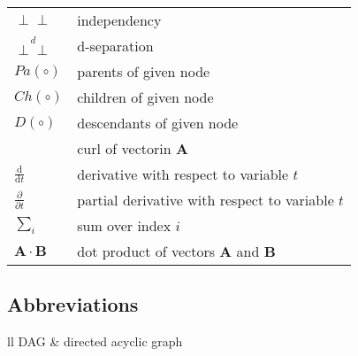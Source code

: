 \documentclass[main=english,12pt,a4paper,pdftex,econ,utf8]{aaltothesis}
\newcommand{\indep}{\perp \!\!\! \perp}
\newcommand{\dsep}{\stackrel{d}{\indep}}
\begin{document}
\begin{tabular}{ll}
$\indep$ & independency \\
$\dsep$ & d-separation \\
$Pa(\circ)$ & parents of given node \\
$Ch(\circ)$ & children of given node \\
$D(\circ)$ & descendants of given node \\
\begin{comment}
    $\nabla \times \mathbf{A}$              & curl of vectorin $\mathbf{A}$\\
    $\displaystyle\frac{\mbox{d}}{\mbox{d} t}$ & derivative with respect to 
    variable $t$\\[3mm]
    $\displaystyle\frac{\partial}{\partial t}$  & partial derivative with respect 
    to variable $t$ \\[3mm]
    $\sum_i $                       & sum over index $i$\\
    $\mathbf{A} \cdot \mathbf{B}$    & dot product of vectors $\mathbf{A}$ and 
    $\mathbf{B}$
\end{comment}
\end{tabular}

\subsection*{Abbreviations}
\begin{tabular}{ll}
DAG & directed acyclic graph
\begin{comment}
    AC         & alternating current \\
    APLAC      & an object-oriented analog circuit simulator and design tool \\
               & (originally Analysis Program for Linear Active Circuits) \\
    BCS        & Bardeen-Cooper-Schrieffer \\ %
    DC         & direct current \\
TEM        & transverse eletromagnetic
\end{comment}
\end{tabular}


\cleardoublepage
\storeinipagenumber
{}
\setcounter{page}{1}
\end{document}
